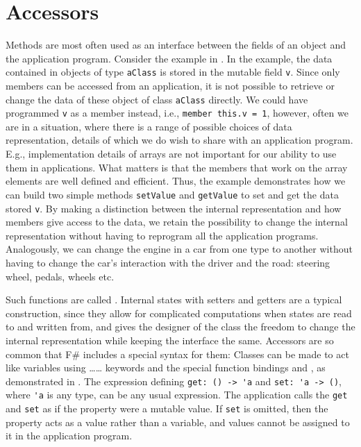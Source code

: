 \section{Accessors}
Methods are most often used as an interface between the fields of an object and the application program. Consider the example in .
%
% 
In the example, the data contained in objects of type \lstinline{aClass} is stored in the mutable field \lstinline{v}. Since only members can be accessed from an application, it is not possible to retrieve or change the data of these object of class \lstinline{aClass} directly. We could have programmed \lstinline{v} as a member instead, i.e., \lstinline{member this.v = 1}, however, often we are in a situation, where there is a range of possible choices of data representation, details of which we do wish to share with an application program. E.g., implementation details of arrays are not important for our ability to use them in applications. What matters is that the members that work on the array elements are well defined and efficient. Thus, the example demonstrates how we can build two simple methods \lstinline{setValue} and \lstinline{getValue} to set and get the data stored \lstinline{v}. By making a distinction between the internal representation and how members give access to the data, we retain the possibility to change the internal representation without having to reprogram all the application programs. Analogously, we can change the engine in a car from one type to another without having to change the car's interaction with the driver and the road: steering wheel, pedals, wheels etc.

Such functions are called .  Internal states with setters and getters are a typical construction, since they allow for complicated computations when states are read to and written from, and gives the designer of the class the freedom to change the internal representation while keeping the interface the same. Accessors are so common that F\# includes a special syntax for them: Classes can be made to act like variables using \dots{}\dots{} keywords and the special function bindings  and , as demonstrated in .
%
% 
The expression defining \lstinline{get: () -> 'a} and \lstinline{set: 'a -> ()}, where \lstinline{'a} is any type, can be any usual expression. The application calls the \lstinline{get} and \lstinline{set} as if the property were a mutable value. If \lstinline{set} is omitted, then the property acts as a value rather than a variable, and values cannot be assigned to it in the application program.

